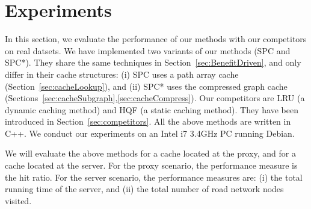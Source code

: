 

\section{Experiments}\label{sec:experiments}
%
In this section, we evaluate the performance of our methods with our competitors on real datsets.
We have implemented two variants of our methods (SPC and SPC*).
They share the same techniques in Section~\ref{sec:BenefitDriven},
and only differ in their cache structures:
(i) SPC uses a path array cache (Section~\ref{sec:cacheLookup}), and (ii) SPC* uses the compressed graph cache (Sections~\ref{sec:cacheSubgraph},\ref{sec:cacheCompress}).
%
Our competitors are LRU (a dynamic caching method) and HQF (a static caching method).
They have been introduced in Section~\ref{sec:competitors}.
All the above methods are written in C++.
We conduct our experiments on {\color{red} an Intel i7 3.4GHz PC running Debian.}


We will evaluate the above methods for a cache located at the proxy, and for a cache located at the server.
For the proxy scenario, the performance measure is the hit ratio.
For the server scenario, the performance measures are: (i) the total running time of the server,
and (ii) the total number of road network nodes visited.












